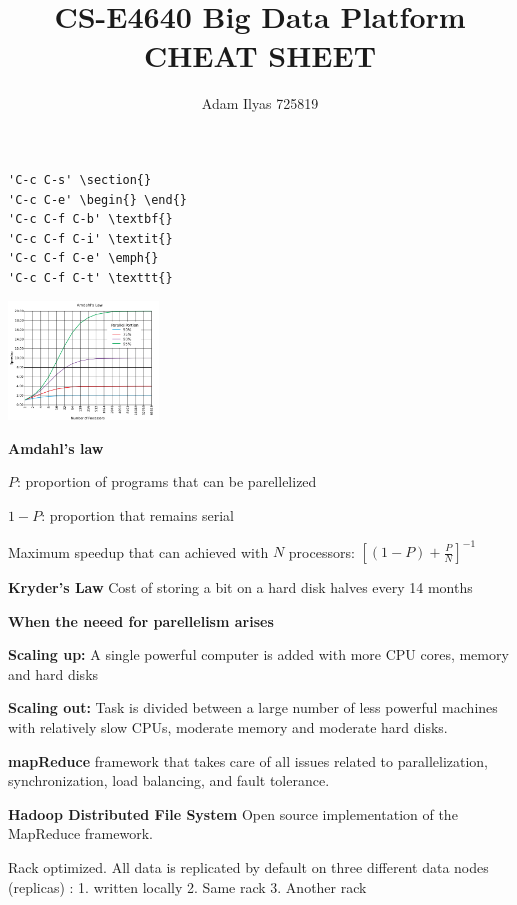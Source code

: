 \documentclass[a4paper,12pt]{article}
\author{Adam Ilyas 725819}
\title{
CS-E4640 Big Data Platform \\ CHEAT SHEET
}
\begin{document}
\vspace{8pt}
\setlength\parindent{0pt}
\maketitle
\begin{verbatim}
'C-c C-s' \section{}
'C-c C-e' \begin{} \end{}
'C-c C-f C-b' \textbf{}
'C-c C-f C-i' \textit{}
'C-c C-f C-e' \emph{}
'C-c C-f C-t' \texttt{}
\end{verbatim}
\includegraphics[width=0.3\textwidth]{amdahl}

\textbf{Amdahl's law}

$P$: proportion of programs that can be parellelized

$1-P$: proportion that remains serial

Maximum speedup that can achieved with $N$ processors: $[{(1-P) + \frac{P}{N}}]^{-1}$

\bigskip
\textbf{Kryder’s Law} Cost of storing a bit on a hard disk halves every 14 months

\bigskip
\textbf{When the neeed for parellelism arises}

\textbf{Scaling up: } A single powerful computer is added with more CPU cores, memory and
hard disks

\textbf{Scaling out: } Task is divided between a large number of less powerful machines with
relatively slow CPUs, moderate memory and moderate hard disks.

\clearpage
\textbf{mapReduce} framework that takes care of all issues related
to parallelization, synchronization, load balancing, and fault
tolerance.

\bigskip
\textbf{Hadoop Distributed File System} Open source implementation of the MapReduce framework.

\bigskip
Rack optimized. All data is replicated by default on three different data nodes (replicas) :
1.  written locally 2. Same rack 3. Another rack
\end{document}
